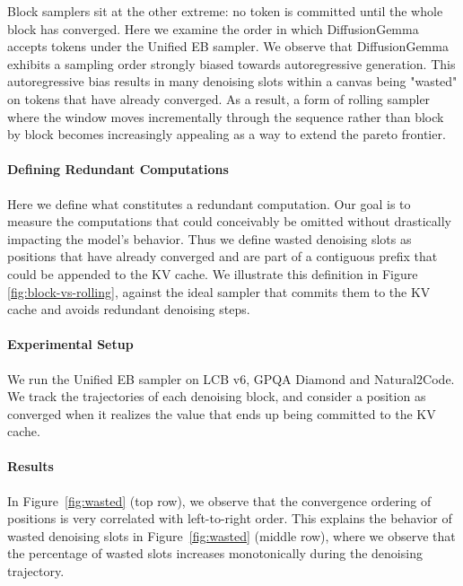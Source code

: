 Block samplers sit at the other extreme: no token is committed until the whole block has converged.
Here we examine the order in which DiffusionGemma accepts tokens under the Unified EB sampler.
We observe that DiffusionGemma exhibits a sampling order strongly biased towards autoregressive generation.
This autoregressive bias results in many denoising slots within a canvas being "wasted" on tokens that have already converged.
As a result, a form of rolling sampler where the window moves incrementally through the sequence rather than block by block becomes increasingly appealing as a way to extend the pareto frontier.



\paragraph{Defining Redundant Computations}
Here we define what constitutes a redundant computation.
Our goal is to measure the computations that could conceivably be omitted without drastically impacting the model's behavior.
Thus we define wasted denoising slots as positions that have already converged and are part of a contiguous prefix that could be appended to the KV cache.
We illustrate this definition in Figure \ref{fig:block-vs-rolling}, against the ideal sampler that commits them to the KV cache and avoids redundant denoising steps.



\paragraph{Experimental Setup}
We run the Unified EB sampler on LCB v6, GPQA Diamond and Natural2Code. We track the trajectories of each denoising block, and consider a position as converged when it realizes the value that ends up being committed to the KV cache.

\paragraph{Results}
In Figure~\ref{fig:wasted} (top row), we observe that the convergence ordering of positions is very correlated with left-to-right order. This explains the behavior of wasted denoising slots in Figure~\ref{fig:wasted} (middle row), where we observe that the percentage of wasted slots increases monotonically during the denoising trajectory.  

